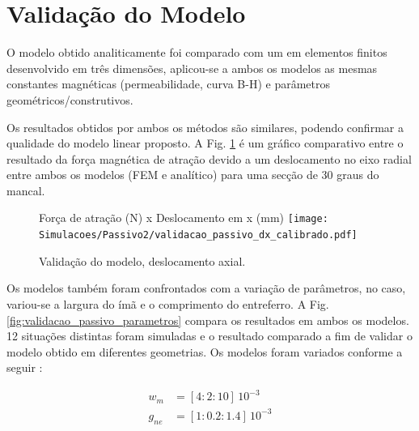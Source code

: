 %

\section{Validação do Modelo}

O modelo obtido analiticamente foi comparado com um em elementos finitos desenvolvido em três dimensões, aplicou-se a ambos os modelos as mesmas constantes magnéticas (permeabilidade, curva B-H) e parâmetros geométricos/construtivos.

Os resultados obtidos por ambos os métodos são similares, podendo confirmar a qualidade do modelo linear proposto.  A Fig. \ref{fig:validacao_passivo_dx_calibrado} é um gráfico comparativo entre o resultado da força magnética de atração devido a um deslocamento no eixo radial entre ambos os modelos (FEM e analítico) para uma secção de 30 graus do mancal.

\begin{figure}[th!]
	\centering
	Força de atração (N) x Deslocamento em x (mm)
	\texttt{[image: Simulacoes/Passivo2/validacao\_passivo\_dx\_calibrado.pdf]}
	\caption{Validação do modelo, deslocamento axial.}
	\label{fig:validacao_passivo_dx_calibrado}
\end{figure}

Os modelos também foram confrontados com a variação de parâmetros, no caso, variou-se a largura do ímã e o comprimento do entreferro. A Fig. \ref{fig:validacao_passivo_parametros} compara os resultados em ambos os modelos. 12 situações distintas foram simuladas e o resultado comparado a fim de validar o modelo obtido em diferentes geometrias. Os modelos foram variados conforme a seguir :

\begin{align}
	w_m &= [4:2:10 ] \, 10^{-3} \\
	g_{ne} & = [1:0.2:1.4] \, 10^{-3}
\end{align}




